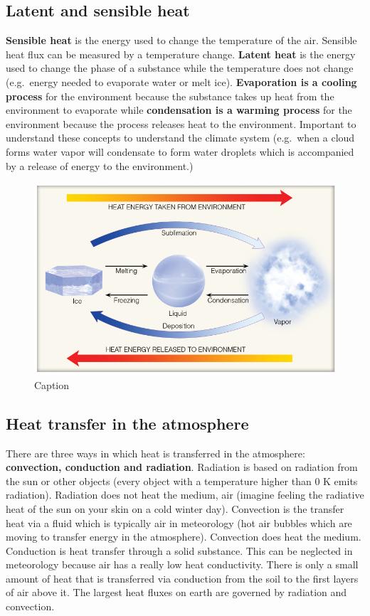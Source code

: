 \documentclass[12pt,oneside]{book}
\begin{document}
\subsection{Latent and sensible heat}\label{latent-and-sensible-heat}

\textbf{Sensible heat} is the energy used to change the temperature of
the air. Sensible heat flux can be measured by a temperature change.
\textbf{Latent heat} is the energy used to change the phase of a
substance while the temperature does not change (e.g.~energy needed to
evaporate water or melt ice). \textbf{Evaporation is a cooling process}
for the environment because the substance takes up heat from the
environment to evaporate while \textbf{condensation is a warming
process} for the environment because the process releases heat to the
environment. Important to understand these concepts to understand the
climate system (e.g.~when a cloud forms water vapor will condensate to
form water droplets which is accompanied by a release of energy to the
environment.)

\begin{figure}

{\centering \includegraphics[width=0.7\linewidth]{figures/Figure116} 

}

\caption{Caption}\label{fig:LSheat}
\end{figure}

\subsection{Heat transfer in the
atmosphere}\label{heat-transfer-in-the-atmosphere}

There are three ways in which heat is transferred in the atmosphere:
\textbf{convection, conduction and radiation}. Radiation is based on
radiation from the sun or other objects (every object with a temperature
higher than 0 K emits radiation). Radiation does not heat the medium,
air (imagine feeling the radiative heat of the sun on your skin on a
cold winter day). Convection is the transfer heat via a fluid which is
typically air in meteorology (hot air bubbles which are moving to
transfer energy in the atmosphere). Convection does heat the medium.
Conduction is heat transfer through a solid substance. This can be
neglected in meteorology because air has a really low heat conductivity.
There is only a small amount of heat that is transferred via conduction
from the soil to the first layers of air above it. The largest heat
fluxes on earth are governed by radiation and convection.
\end{document}
